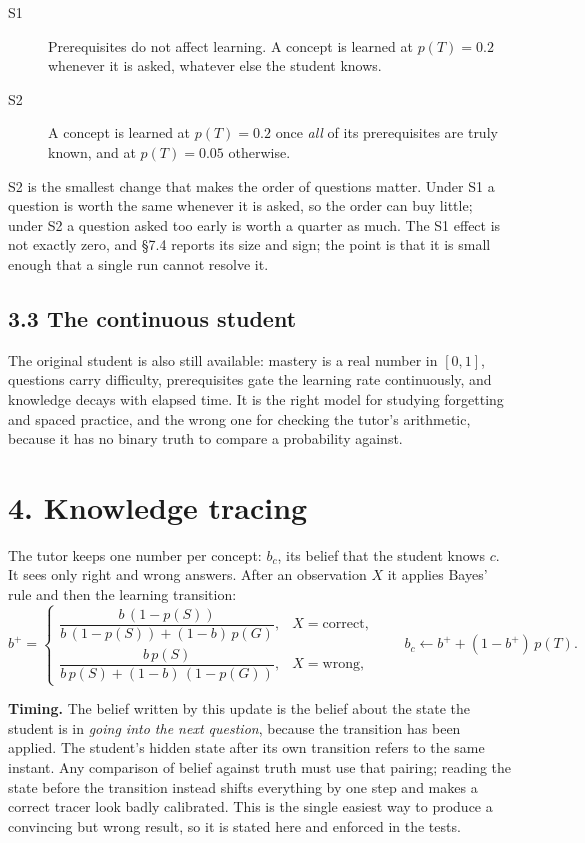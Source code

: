 \documentclass[11pt]{article}
\begin{document}
\begin{description}
\item[S1] Prerequisites do not affect learning. A concept is learned at
$p(T)=0.2$ whenever it is asked, whatever else the student knows.
\item[S2] A concept is learned at $p(T)=0.2$ once \emph{all} of its
prerequisites are truly known, and at $p(T)=0.05$ otherwise.
\end{description}

S2 is the smallest change that makes the order of questions matter. Under S1
a question is worth the same whenever it is asked, so the order can buy
little; under S2 a question asked too early is worth a quarter as much. The
S1 effect is not exactly zero, and \S7.4 reports its size and sign; the point
is that it is small enough that a single run cannot resolve it.

\subsection*{3.3 The continuous student}

The original student is also still available: mastery is a real number in
$[0,1]$, questions carry difficulty, prerequisites gate the learning rate
continuously, and knowledge decays with elapsed time. It is the right model
for studying forgetting and spaced practice, and the wrong one for checking
the tutor's arithmetic, because it has no binary truth to compare a
probability against.

\section*{4. Knowledge tracing}

The tutor keeps one number per concept: $b_c$, its belief that the student
knows $c$. It sees only right and wrong answers. After an observation $X$ it
applies Bayes' rule and then the learning transition:
\begin{equation}
b^{+} =
\begin{cases}
\dfrac{b\,(1-p(S))}{b\,(1-p(S)) + (1-b)\,p(G)}, & X = \text{correct},\\[14pt]
\dfrac{b\,p(S)}{b\,p(S) + (1-b)\,(1-p(G))}, & X = \text{wrong},
\end{cases}
\qquad
b_c \leftarrow b^{+} + (1-b^{+})\,p(T).
\end{equation}

\textbf{Timing.} The belief written by this update is the belief about the
state the student is in \emph{going into the next question}, because the
transition has been applied. The student's hidden state after its own
transition refers to the same instant. Any comparison of belief against truth
must use that pairing; reading the state before the transition instead shifts
everything by one step and makes a correct tracer look badly calibrated. This
is the single easiest way to produce a convincing but wrong result, so it is
stated here and enforced in the tests.
\end{document}

